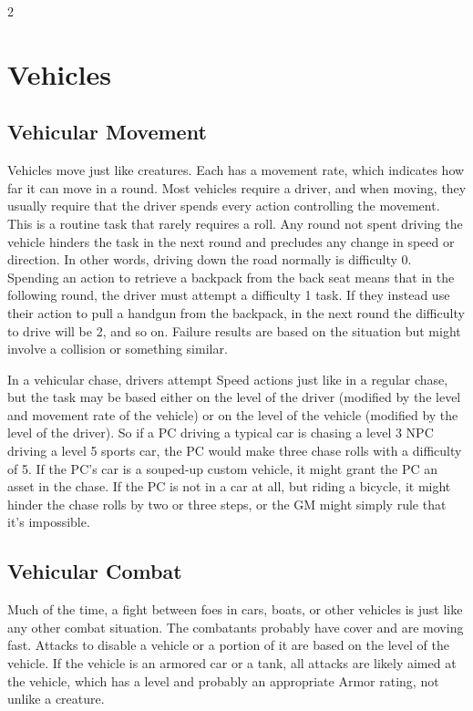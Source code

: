\begin{multicols}{2}

\chapter{Vehicles}

\section{Vehicular Movement}

Vehicles move just like creatures. Each has a movement rate, which indicates how far it can move in a round. Most vehicles require a driver, and when moving, they usually require that the driver spends every action controlling the movement. This is a routine task that rarely requires a roll. Any round not spent driving the vehicle hinders the task in the next round and precludes any change in speed or direction. In other words, driving down the road normally is difficulty 0. Spending an action to retrieve a backpack from the back seat means that in the following round, the driver must attempt a difficulty 1 task. If they instead use their action to pull a handgun from the backpack, in the next round the difficulty to drive will be 2, and so on. Failure results are based on the situation but might involve a collision or something similar.

In a vehicular chase, drivers attempt Speed actions just like in a regular chase, but the task may be based either on the level of the driver (modified by the level and movement rate of the vehicle) or on the level of the vehicle (modified by the level of the driver). So if a PC driving a typical car is chasing a level 3 NPC driving a level 5 sports car, the PC would make three chase rolls with a difficulty of 5. If the PC’s car is a souped-up custom vehicle, it might grant the PC an asset in the chase. If the PC is not in a car at all, but riding a bicycle, it might hinder the chase rolls by two or three steps, or the GM might simply rule that it’s impossible.

\section{Vehicular Combat}
Much of the time, a fight between foes in cars, boats, or other vehicles is just like any other combat situation. The combatants probably have cover and are moving fast. Attacks to disable a vehicle or a portion of it are based on the level of the vehicle. If the vehicle is an armored car or a tank, all attacks are likely aimed at the vehicle, which has a level and probably an appropriate Armor rating, not unlike a creature.


\end{multicols}
